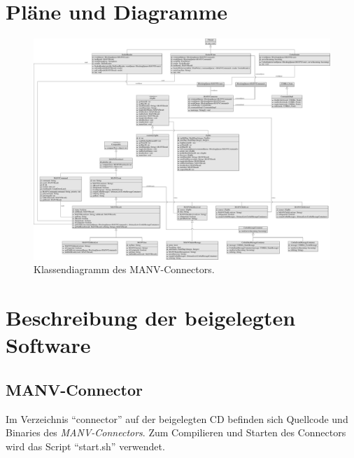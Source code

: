 
\chapter{Pläne und Diagramme}\label{anhang_diagramme}
    \begin{figure}
            \includegraphics*[width=1\textwidth]{uml_diagramme/manvconnector_uml.pdf}
            \caption{Klassendiagramm des MANV-Connectors.}
            \label{klassendiagramm_manvconnector}
    \end{figure}

\chapter{Beschreibung der beigelegten Software}\label{anhang_beschreibung_software}
    \section{MANV-Connector}

    Im Verzeichnis "`connector"' auf der beigelegten CD befinden sich
    Quellcode und Binaries des \emph{MANV-Connectors}. Zum Compilieren
    und Starten des Connectors wird das Script "`start.sh"' verwendet.

